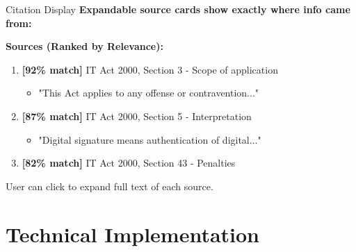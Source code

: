 \documentclass[11pt,aspectratio=16:9]{beamer}
\begin{document}
\begin{frame}{Citation Display}
    \textbf{Expandable source cards show exactly where info came from:}
    
    \vspace{0.5cm}
    
    \small
    
    \vspace{0.3cm}
    
    \textbf{Sources (Ranked by Relevance):}
    \begin{enumerate}
        \item \textbf{[92\% match]} IT Act 2000, Section 3 - Scope of application
            \begin{itemize}
                \item {\small "This Act applies to any offense or contravention..."}
            \end{itemize}
        \item \textbf{[87\% match]} IT Act 2000, Section 5 - Interpretation
            \begin{itemize}
                \item {\small "Digital signature means authentication of digital..."}
            \end{itemize}
        \item \textbf{[82\% match]} IT Act 2000, Section 43 - Penalties
    \end{enumerate}
    
    \vspace{0.5cm}
    {\small User can click to expand full text of each source.}
\end{frame}

\section{Technical Implementation}
\end{document}
